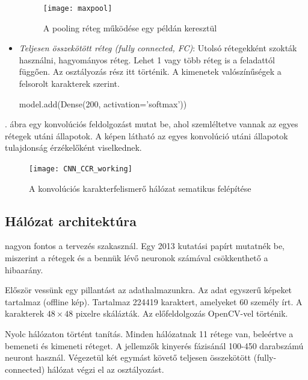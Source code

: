 \begin{itemize}
\begin{figure}
\centering
\texttt{[image: maxpool]}
\caption{A pooling réteg működése egy példán keresztül}
\label{fig:maxpool}
\end{figure}

\item \textit{Teljesen összekötött réteg (fully connected, FC)}: Utolsó rétegekként szokták használni, hagyományos réteg. Lehet 1 vagy több réteg is a feladattól függően. Az osztályozás rész itt történik. A kimenetek valószínűségek a felsorolt karakterek szerint.
\begin{python}
model.add(Dense(200, activation='softmax'))
\end{python}
\end{itemize}

. ábra egy konvolúciós feldolgozást mutat be, ahol szemléltetve vannak az egyes rétegek utáni állapotok. A képen látható az egyes konvolúció utáni állapotok tulajdonság érzékelőként viselkednek.

\begin{figure}
\centering
\texttt{[image: CNN\_CCR\_working]}
\caption{A konvolúciós karakterfelismerő hálózat sematikus felépítése}
\label{fig:CNN_CCR_working}
\end{figure}

\subsection{Hálózat architektúra}

nagyon fontos a tervezés szakasznál. Egy 2013 kutatási papírt\cite{cirecsan2015multi} mutatnék be, miszerint a rétegek és a bennük lévő neuronok számával csökkenthető a hibaarány.

Először vessünk egy pillantást az adathalmazunkra. Az adat egyszerű képeket tartalmaz (offline kép). Tartalmaz 224419 karaktert, amelyeket 60 személy írt. A karakterek $48 \times 48$ pixelre skálázták. Az előfeldolgozás OpenCV-vel történik.

Nyolc hálózaton történt tanítás. Minden hálózatnak 11 rétege van, beleértve a bemeneti és kimeneti réteget. A jellemzők kinyerés fázisánál 100-450 darabszámú neuront használ. Végezetül két egymást követő teljesen összekötött (fully-connected) hálózat végzi el az osztályozást.

